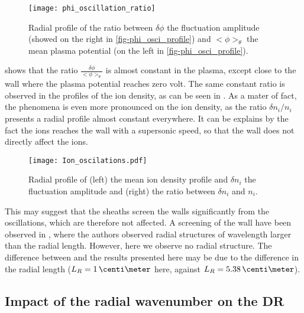   \begin{figure}[hbt]
    \centering
    \texttt{[image: phi\_oscillation\_ratio]}
    \caption{Radial profile of the ratio between $\delta \phi$ the fluctuation amplitude (showed on the right in \cref{fig-phi_osci_profile}) and $<\phi>_{\theta}$  the mean plasma potential (on the left in \cref{fig-phi_osci_profile}).}
    \label{fig-ratio}
  \end{figure}
  
   shows that the ratio $\frac{\delta \phi}{ <\phi>_{\theta}}$ is almost constant in the plasma, except close to the wall where the plasma potential reaches zero volt.
  The same constant ratio is observed in the profiles of the ion density, as can be seen in .
  As a mater of fact, the phenomena is even more pronounced on the ion density, as the ratio $\delta n_i / n_i$ presents a radial profile almost constant everywhere.
  It can be explains by the fact the ions reaches the wall with a supersonic speed, so that the wall does not directly affect the ions.
  
  
  \begin{figure}[hbt]
    \centering
    \texttt{[image: Ion\_oscilations.pdf]}
    \caption{Radial profile of (left) the mean ion density profile and $\delta n_i$ the fluctuation amplitude and (right) the ratio between $\delta n_i$ and $n_i$.}
    \label{fig-ion_oscilation}
  \end{figure}
  
  \vspace{1em}
  This may suggest that the sheaths screen  the walls significantly from the oscillations,  which are therefore not affected.
  A screening of the wall have been observed in \citet{janhunen2018}, where the authors observed radial structures of wavelength larger than the radial length.
  However, here we observe no radial structure.
  The difference between  \citet{janhunen2018} and the results presented here may be due to the difference in the radial length ($L_R =1 \,\centi\meter$ here, against $L_R = 5.38\,\centi\meter$).
  
  \subsection{Impact of the radial wavenumber on the \acs{DR}}
   \label{subsec-kr}

